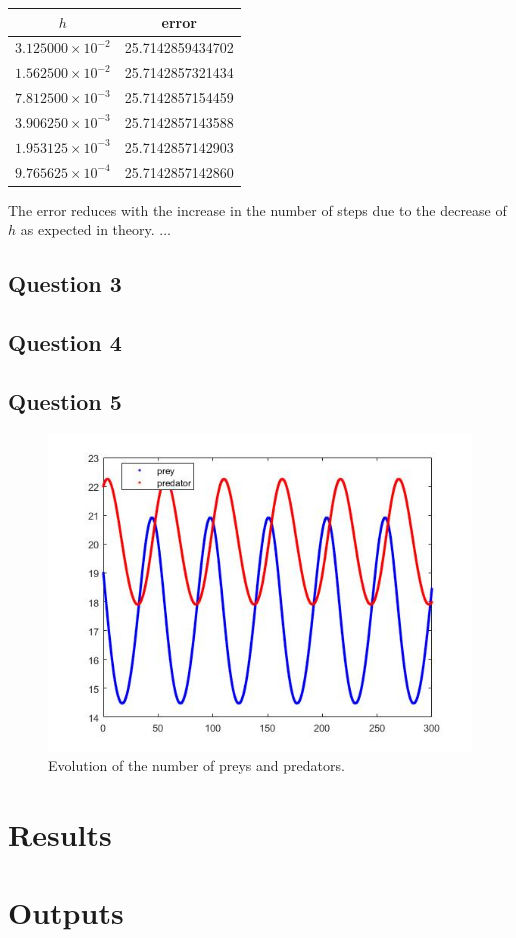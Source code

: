 \documentclass[a4paper, 11pt]{article}
\begin{document}
	\begin{table}[H]
		\centering
		\begin{tabular}{c|c}
			\textbf{$h$}& \textbf{error}   \\ \hline
			$ 3.125000\times 10^{-2} $ & 25.7142859434702 \\ \hline
			$ 1.562500\times 10^{-2} $ & 25.7142857321434 \\ \hline
			$ 7.812500\times 10^{-3} $ & 25.7142857154459 \\ \hline
			$ 3.906250\times 10^{-3} $ & 25.7142857143588 \\ \hline
			$ 1.953125\times 10^{-3} $ & 25.7142857142903 \\ \hline
			$ 9.765625\times 10^{-4} $ & 25.7142857142860 \\ \hline
		\end{tabular}
	\end{table}
	
	The error reduces with the increase in the number of steps due to the decrease of $h$ as expected in theory. $\ldots$		
	
	\subsection*{Question 3}
	
	\subsection*{Question 4}
	
	\subsection*{Question 5}
	\begin{figure}[H]
		\centering
		\includegraphics[width=\linewidth]{ex5.jpg}
		\caption{Evolution of the number of preys and predators.}
		\label{fig:ex5}
	\end{figure}
	
	
	
	
	
	\section*{Results}
	
	
	\section*{Outputs}
	
	
	
\end{document}
